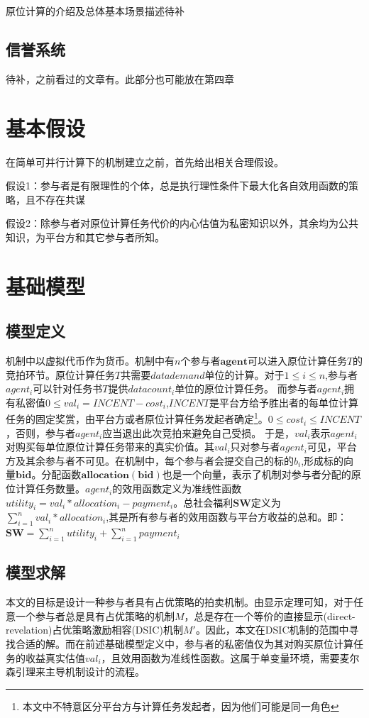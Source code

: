 \documentclass[promaster]{thesis-uestc}
\begin{document}
原位计算的介绍及总体基本场景描述待补

\subsection{信誉系统}
待补，之前看过的文章有。此部分也可能放在第四章

\section{基本假设}
在简单可并行计算下的机制建立之前，首先给出相关合理假设。

假设1：参与者是有限理性的个体，总是执行理性条件下最大化各自效用函数的策略，且不存在共谋

假设2：除参与者对原位计算任务代价的内心估值为私密知识以外，其余均为公共知识，为平台方和其它参与者所知。

\section{基础模型}

\subsection{模型定义}\label{jichumoxingdingyi}
机制中以虚拟代币作为货币。机制中有$n$个参与者$\mathbf{agent}$可以进入原位计算任务$T$的竞拍环节。原位计算任务$T$共需要$datademand$单位的计算。对于$1\leq i\leq n$,参与者$agent_i$可以针对任务书$T$提供$datacount_i$单位的原位计算任务。
而参与者$agent_i$拥有私密值$0 \leq val_i = INCENT-cost_i$,$INCENT$是平台方给予胜出者的每单位计算任务的固定奖赏，由平台方或者原位计算任务发起者确定\footnote{本文中不特意区分平台方与计算任务发起者，因为他们可能是同一角色}。$0 \leq cost_i \leq INCENT$，否则，参与者$agent_i$应当退出此次竞拍来避免自己受损。 于是，$val_i$表示$agent_i$对购买每单位原位计算任务带来的真实价值。其$val_i$只对参与者$agent_i$可见，平台方及其余参与者不可见。在机制中，每个参与者会提交自己的标的$b_i$,形成标的向量$\mathbf{bid}$。分配函数$\mathbf{allocation}(\mathbf{bid})$也是一个向量，表示了机制对参与者分配的原位计算任务数量。$agent_i$的效用函数定义为准线性函数$utility_i = val_i*allocation_i-payment_i$。总社会福利$\mathbf{SW}$定义为$\sum_{i=1}^n{val_i*allocation_i}$,其是所有参与者的效用函数与平台方收益的总和。即：$\mathbf{SW} = \sum_{i=1}^n{utility_i}+\sum_{i=1}^{n}{payment_i}$

\subsection{模型求解}
本文的目标是设计一种参与者具有占优策略的拍卖机制。由显示定理可知，对于任意一个参与者总是具有占优策略的机制$M$，总是存在一个等价的直接显示(direct-revelation)占优策略激励相容(DSIC)机制$M'$。因此，本文在DSIC机制的范围中寻找合适的解。而在前述基础模型定义中，参与者的私密值仅为其对购买原位计算任务的收益真实估值$val_i$，且效用函数为准线性函数。这属于单变量环境，需要麦尔森引理来主导机制设计的流程。
\end{document}
